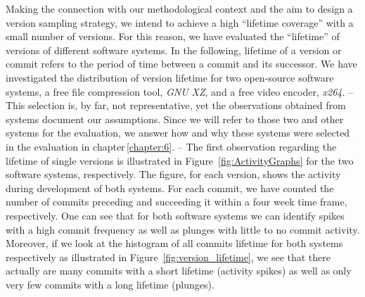 Making the connection with our methodological context and the aim to design a
version sampling strategy, we intend to achieve a high “lifetime coverage” with
a small number of versions. For this reason, we have evaluated the “lifetime”
of versions of different software systems. In the following, lifetime of a
version or commit refers to the period of time between a commit and its
successor. We have investigated the distribution of version lifetime for two
open-source software systems, a free file compression tool, \emph{GNU XZ}, and a
free video encoder, \emph{x264}. – This selection is, by far, not
representative, yet the observations obtained from systems document our assumptions. Since we will
refer to those two and other systems for the evaluation, we answer how and why
these systems were selected in the evaluation in chapter\,\ref{chapter:6}.  –
The first observation regarding the lifetime of single versions is illustrated in
Figure~\ref{fig:ActivityGraphs} for the two software systems, respectively. The
figure, for each version, shows the activity during development of both systems.
For each commit, we have counted the number of commits preceding and succeeding
it within a four week time frame, respectively. One can see that for both
software systems we can identify spikes with a high commit frequency as well as
plunges with little to no commit activity. Moreover, if we look at the
histogram of all commits lifetime for both systems respectively as illustrated
in Figure~\ref{fig:version_lifetime}, we see that there actually are many
commits with a short lifetime (activity spikes) as well as only very few commits with a long lifetime (plunges).

